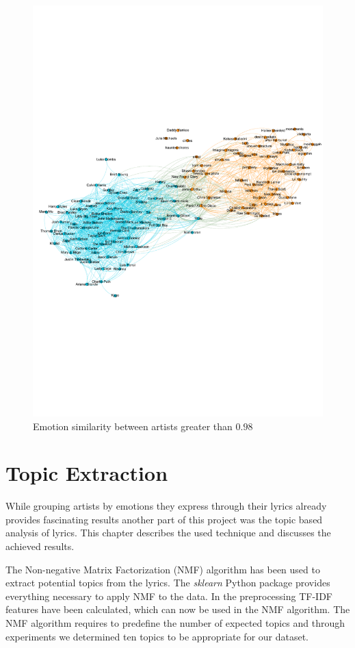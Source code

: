 \documentclass[10pt,a4paper]{article}
\begin{document}
		\begin{figure}[htb]
			\centering
			\includegraphics[trim=0mm 80mm 0mm 85mm, clip, width=0.8\linewidth]{data/emotion_similarity}
			\caption{Emotion similarity between artists greater than $0.98$}
			\label{fig:emotionsimilarity}
		\end{figure}
	
	\section{Topic Extraction}
	\label{sec:topicextraction}
	While grouping artists by emotions they express through their lyrics already provides fascinating results another part of this project was the topic based analysis of lyrics. This chapter describes the used technique and discusses the achieved results.
	
	The Non-negative Matrix Factorization (NMF) algorithm has been used to extract potential topics from the lyrics. The \textit{sklearn} Python package provides everything necessary to apply NMF to the data. In the preprocessing TF-IDF features have been calculated, which can now be used in the NMF algorithm. The NMF algorithm requires to predefine the number of expected topics and through experiments we determined ten topics to be appropriate for our dataset. 
	
\end{document}
